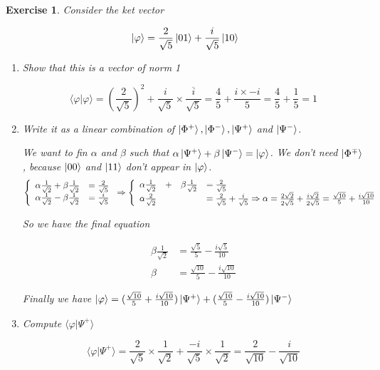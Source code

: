 \documentclass{article}
\theoremstyle{plain}
\newtheorem{exo}{Exercise}%
\begin{document}
    \begin{exo}
      Consider the ket vector

      $$\ket{\varphi} = \frac{2}{\sqrt 5} \ket{01} + \frac{i}{\sqrt 5} \ket{10}$$

      \begin{enumerate}[label=(\alph*)]
        \item Show that this is a vector of norm 1

          $$ \langle \varphi|\varphi \rangle =
             \left( \frac{2}{\sqrt 5} \right) ^2 +
                    \frac{i}{\sqrt 5} \times \overline{\frac{i}{\sqrt 5}}
            = \frac 4 5 + \frac{i \times -i}{5} = \frac 4 5 + \frac 1 5 = 1$$

          \item Write it as a linear combination of $\ket{\Phi^+}, \ket{\Phi^-},
                \ket{\Psi^+}$ and $\ket{\Psi^-}$.

            We want to fin $\alpha$ and $\beta$ such that
            $\alpha \ket{\Psi^+} + \beta \ket{\Psi^-} = \ket{\varphi}$.
            We don't need $\ket{\Phi^\mp}$, because $\ket{00}$ and $\ket{11}$
            don't appear in $\ket{\varphi}$.
\newpage
$$
\left\{
\begin{array}{r l c}
  \alpha \frac{1}{\sqrt 2} + \beta \frac{1}{\sqrt 2} &= \frac{2}{\sqrt 5} \\
  \alpha \frac{1}{\sqrt 2} - \beta \frac{1}{\sqrt 2} &= \frac{i}{\sqrt 5}
\end{array}
\right. \Rightarrow
\left\{
\begin{array}{c c c l}
  \alpha \frac{1}{\sqrt 2} &+& \beta \frac{1}{\sqrt 2} &= \frac{2}{\sqrt 5} \\
  \alpha \frac{2}{\sqrt 2} & & &= \frac{2}{\sqrt 5} + \frac{i}{\sqrt 5} \Rightarrow
  \alpha = \frac{2 \sqrt 2}{2 \sqrt 5} + \frac{i \sqrt 2}{2 \sqrt 5} =
  \frac{\sqrt{10}}{5} + \frac{i\sqrt{10}}{10}
\end{array}
\right.
$$

          So we have the final equation

\begin{align*}
  \beta \frac{1}{\sqrt 2} &= \frac{\sqrt 5}{5} - \frac{i\sqrt{5}}{10} \\
  \beta &= \frac{\sqrt{10}}{5} - \frac{i\sqrt{10}}{10}
\end{align*}

    Finally we have $\ket{\varphi} =
                      (\frac{\sqrt{10}}{5} + \frac{i\sqrt{10}}{10}) \ket{\Psi^+}
                    + (\frac{\sqrt{10}}{5} - \frac{i\sqrt{10}}{10}) \ket{\Psi^-}$

        \item Compute $\langle \varphi | \Psi^+ \rangle$

$$
  \langle \varphi | \Psi^+ \rangle = \frac{2}{\sqrt 5} \times \frac{1}{\sqrt 2}
          + \frac{-i}{\sqrt 5} \times \frac{1}{\sqrt 2} =
          \frac{2}{\sqrt{10}} - \frac{i}{\sqrt{10}}
$$
      \end{enumerate}
    \end{exo}
\end{document}
